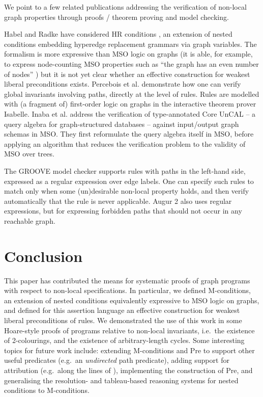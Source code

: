 \documentclass{llncs}
\begin{document}
	We point to a few related publications addressing the verification of non-local graph properties through proofs / theorem proving and model checking.
	
	Habel and Radke have considered HR conditions \cite{Habel-Radke10a}, an extension of nested conditions embedding hyperedge replacement grammars via graph variables. The formalism is more expressive than MSO logic on graphs (it is able, for example, to express node-counting MSO properties such as ``the graph has an even number of nodes'' \cite{Radke13a}) but it is not yet clear whether an effective construction for weakest liberal preconditions exists. Percebois et al. \cite{Percebois-Strecker-Tran13a} demonstrate how one can verify global invariants involving paths, directly at the level of rules. Rules are modelled with (a fragment of) first-order logic on graphs in the interactive theorem prover Isabelle. Inaba et al. \cite{Inaba-et-al11a} address the verification of type-annotated Core UnCAL -- a query algebra for graph-structured databases -- against input/output graph schemas in MSO. They first reformulate the query algebra itself in MSO, before applying an algorithm that reduces the verification problem to the validity of MSO over trees.
	
	The GROOVE model checker \cite{Ghamarian-Mol-Rensink-Zambon-Zimakova12a} supports rules with paths in the left-hand side, expressed as a regular expression over edge labels. One can specify such rules to match only when some (un)desirable non-local property holds, and then verify automatically that the rule is never applicable. Augur 2 \cite{Koenig-Kozioura08a} also uses regular expressions, but for expressing forbidden paths that should not occur in any reachable graph.
	
	\section{Conclusion}\label{sec:conclusion}
	
	This paper has contributed the means for systematic proofs of graph programs with respect to non-local specifications. In particular, we defined M-conditions, an extension of nested conditions equivalently expressive to MSO logic on graphs, and defined for this assertion language an effective construction for weakest liberal preconditions of rules. We demonstrated the use of this work in some Hoare-style proofs of programs relative to non-local invariants, i.e.\ the existence of 2-colourings, and the existence of arbitrary-length cycles. Some interesting topics for future work include: extending M-conditions and Pre to support other useful predicates (e.g.\ an \emph{undirected} path predicate), adding support for attribution (e.g.\ along the lines of \cite{Poskitt-Plump12a,Poskitt13a}), implementing the construction of Pre, and generalising the resolution- and tableau-based reasoning systems for nested conditions \cite{Pennemann08a,Lambers-Orejas14a} to M-conditions.\\
	
\end{document}

